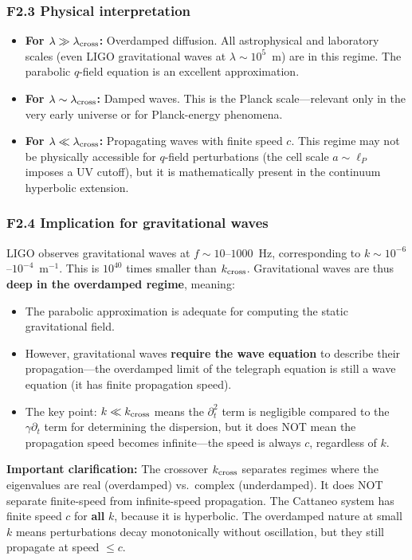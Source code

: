 \documentclass[reprint]{revtex4-2}
\begin{document}
\subsubsection{F2.3 Physical interpretation}

\begin{itemize}
\item \textbf{For $\lambda \gg \lambda_{\rm cross}$:} Overdamped diffusion. All astrophysical and laboratory scales (even LIGO gravitational waves at $\lambda \sim 10^5$~m) are in this regime. The parabolic $q$-field equation is an excellent approximation.
\item \textbf{For $\lambda \sim \lambda_{\rm cross}$:} Damped waves. This is the Planck scale---relevant only in the very early universe or for Planck-energy phenomena.
\item \textbf{For $\lambda \ll \lambda_{\rm cross}$:} Propagating waves with finite speed $c$. This regime may not be physically accessible for $q$-field perturbations (the cell scale $a \sim \ell_P$ imposes a UV cutoff), but it is mathematically present in the continuum hyperbolic extension.
\end{itemize}

\subsubsection{F2.4 Implication for gravitational waves}

LIGO observes gravitational waves at $f \sim 10$--$1000$~Hz, corresponding to $k \sim 10^{-6}$--$10^{-4}$~m$^{-1}$. This is $10^{40}$ times smaller than $k_{\rm cross}$. Gravitational waves are thus \textbf{deep in the overdamped regime}, meaning:
\begin{itemize}
\item The parabolic approximation is adequate for computing the static gravitational field.
\item However, gravitational waves \textbf{require the wave equation} to describe their propagation---the overdamped limit of the telegraph equation is still a wave equation (it has finite propagation speed).
\item The key point: $k \ll k_{\rm cross}$ means the $\partial_t^2$ term is negligible compared to the $\gamma\partial_t$ term for determining the dispersion, but it does NOT mean the propagation speed becomes infinite---the speed is always $c$, regardless of $k$.
\end{itemize}

\textbf{Important clarification:} The crossover $k_{\rm cross}$ separates regimes where the eigenvalues are real (overdamped) vs.\ complex (underdamped). It does NOT separate finite-speed from infinite-speed propagation. The Cattaneo system has finite speed $c$ for \textbf{all} $k$, because it is hyperbolic. The overdamped nature at small $k$ means perturbations decay monotonically without oscillation, but they still propagate at speed $\le c$.
\end{document}
